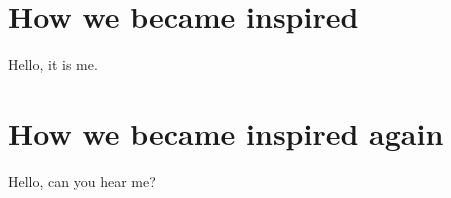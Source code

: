 \appendix

\section{How we became inspired}
Hello, it is me.

\section{How we became inspired again}
Hello, can you hear me?